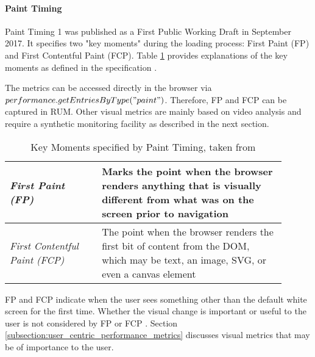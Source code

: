 
\paragraph{Paint Timing} %

Paint Timing 1 was published as a First Public Working Draft in September 2017.  
It specifies two "key moments" during the loading process: First Paint (FP) and First Contentful Paint (FCP).
Table \ref{table:paint_timing} provides explanations of the key moments as defined in the specification \cite{2017W3CPaintTiming}.

The metrics can be accessed directly in the browser via $performance.getEntriesByType("paint")$.
Therefore, FP and FCP can be captured in RUM.
Other visual metrics are mainly based on video analysis and require a synthetic monitoring facility as described in the next section.

\begin{table}[h]
	\small
	\centering
	\begin{tabular}{ | p{0.3\linewidth} | p{0.6\linewidth} | }
	\hline
	\textit{First Paint (FP)} & Marks the point when the browser renders anything that is visually different from what was on the screen prior to navigation \\ 
	\hline
	\textit{First Contentful Paint (FCP)} & The point when the browser renders the first bit of content from the DOM, which may be text, an image, SVG, or even a canvas element \\  
	\hline
	\end{tabular}
	\medskip
	\caption[Key Moments specified by Paint Timing]{Key Moments specified by Paint Timing, taken from \cite{2017W3CPaintTiming}}
	\label{table:paint_timing}
\end{table}

FP and FCP indicate when the user sees something other than the default white screen for the first time.
Whether the visual change is important or useful to the user is not considered by FP or FCP \cite{2013Meenan}.
Section \ref{subsection:user_centric_performance_metrics} discusses visual metrics that may be of importance to the user.



